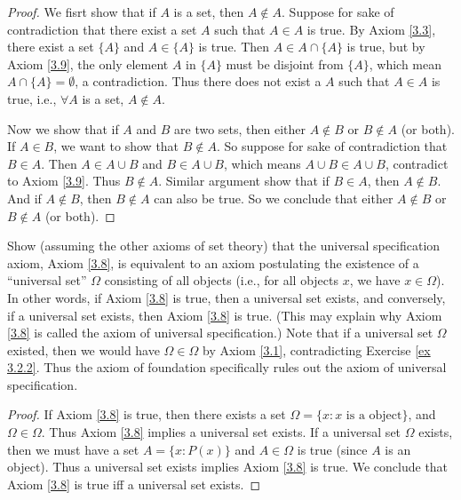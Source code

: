 \begin{proof}
    We fisrt show that if \(A\) is a set, then \(A \notin A\).
    Suppose for sake of contradiction that there exist a set \(A\) such that \(A \in A\) is true.
    By Axiom \ref{3.3}, there exist a set \(\{A\}\) and \(A \in \{A\}\) is true.
    Then \(A \in A \cap \{A\}\) is true, but by Axiom \ref{3.9}, the only element \(A\) in \(\{A\}\) must be disjoint from \(\{A\}\), which mean \(A \cap \{A\} = \emptyset\), a contradiction.
    Thus there does not exist a \(A\) such that \(A \in A\) is true, i.e., \(\forall A\) is a set, \(A \notin A\).

    Now we show that if \(A\) and \(B\) are two sets, then either \(A \notin B\) or \(B \notin A\) (or both).
    If \(A \in B\), we want to show that \(B \notin A\).
    So suppose for sake of contradiction that \(B \in A\).
    Then \(A \in A \cup B\) and \(B \in A \cup B\), which means \(A \cup B \in A \cup B\), contradict to Axiom \ref{3.9}.
    Thus \(B \notin A\).
    Similar argument show that if \(B \in A\), then \(A \notin B\).
    And if \(A \notin B\), then \(B \notin A\) can also be true.
    So we conclude that either \(A \notin B\) or \(B \notin A\) (or both).
\end{proof}

\begin{exercise}\label{ex 3.2.3}
    Show (assuming the other axioms of set theory) that the universal specification axiom, Axiom \ref{3.8}, is equivalent to an axiom postulating the existence of a ``universal set'' \(\Omega\) consisting of all objects (i.e., for all objects \(x\), we have \(x \in \Omega\)).
    In other words, if Axiom \ref{3.8} is true, then a universal set exists, and conversely, if a universal set exists, then Axiom \ref{3.8} is true.
    (This may explain why Axiom \ref{3.8} is called the axiom of universal specification.)
    Note that if a universal set \(\Omega\) existed, then we would have \(\Omega \in \Omega\) by Axiom \ref{3.1}, contradicting Exercise \ref{ex 3.2.2}.
    Thus the axiom of foundation specifically rules out the axiom of universal specification.
\end{exercise}

\begin{proof}
    If Axiom \ref{3.8} is true, then there exists a set \(\Omega = \{x: x \text{ is a object}\}\), and \(\Omega \in \Omega\).
    Thus Axiom \ref{3.8} implies a universal set exists.
    If a universal set \(\Omega\) exists, then we must have a set \(A = \{x: P(x)\}\) and \(A \in \Omega\) is true (since \(A\) is an object).
    Thus a universal set exists implies Axiom \ref{3.8} is true.
    We conclude that Axiom \ref{3.8} is true iff a universal set exists.
\end{proof}